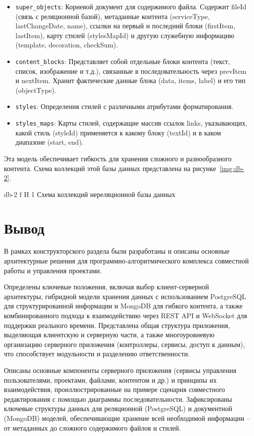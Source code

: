 \begin{itemize}
    \item \texttt{super\_objects}: Корневой документ для содержимого файла. Содержит fileId (связь с реляционной базой), метаданные контента (serviceType, lastChangeDate, name), ссылки на первый и последний блоки (firstItem, lastItem), карту стилей (stylesMapId) и другую служебную информацию (template, decoration, checkSum).
    \item \texttt{content\_blocks}: Представляет собой отдельные блоки контента (текст, список, изображение и т.д.), связанные в последовательность через prevItem и nextItem. Хранит фактические данные блока (data, items, label) и его тип (objectType).
    \item \texttt{styles}: Определения стилей с различными атрибутами форматирования.
    \item \texttt{styles\_maps}: Карты стилей, содержащие массив ссылок links, указывающих, какой стиль (styleId) применяется к какому блоку (textId) и в каком диапазоне (start, end).
\end{itemize}

Эта модель обеспечивает гибкость для хранения сложного и разнообразного контента. 
\clearpage
Схема коллекций этой базы данных представлена на рисунке~\ref{img:db-2}.

	{db-2}
	{f}
	{H}
	{1\textwidth}
	{Схема коллекций нереляционной базы данных}

\section*{Вывод}

В рамках конструкторского раздела были разработаны и описаны основные архитектурные решения для программно-алгоритмического комплекса совместной работы и управления проектами.

Определены ключевые положения, включая выбор клиент-серверной архитектуры, гибридной модели хранения данных с использованием PostgreSQL для структурированной информации и MongoDB для гибкого контента, а также комбинированного подхода к взаимодействию через REST API и WebSocket для поддержки реального времени. 
Представлена общая структура приложения, выделяющая клиентскую и серверную части, а также многоуровневую организацию серверного приложения (контроллеры, сервисы, доступ к данным), что способствует модульности и разделению ответственности.

Описаны основные компоненты серверного приложения (сервисы управления пользователями, проектами, файлами, контентом и др.) и принципы их взаимодействия, проиллюстрированные на примере сценария совместного редактирования с помощью диаграммы последовательности. 
Зафиксированы ключевые структуры данных для реляционной (PostgreSQL) и документной (MongoDB) моделей, обеспечивающие хранение всей необходимой информации – от метаданных до сложного содержимого файлов и стилей. 
